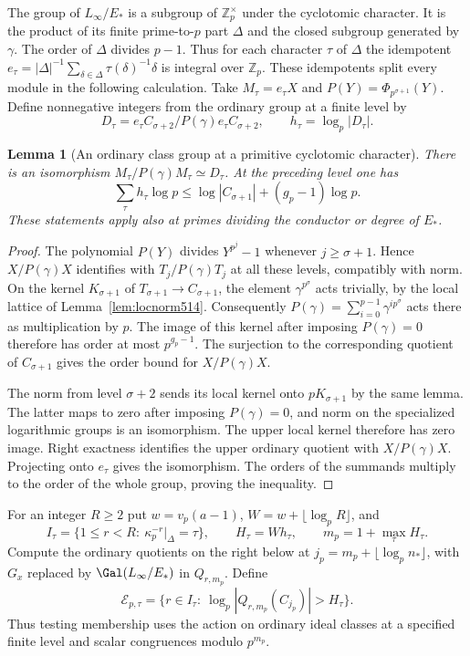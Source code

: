 \documentclass[a4paper,11pt]{article}
\newtheorem{lemma}[proposition]{Lemma}
\theoremstyle{definition}
\theoremstyle{remark}
\newcommand{\ZZ}{\mathbb Z}\newcommand{\ord}{\operatorname{ord}}
\numberwithin{equation}{section}
\begin{document}
The group of \(L_\infty/E_*\) is a subgroup of
\(\ZZ_p^\times\) under the cyclotomic character. It is the product
of its finite prime-to-\(p\) part \(\Delta\) and the closed
subgroup generated by \(\gamma\). The order of \(\Delta\)
divides \(p-1\). Thus for each character \(\tau\) of \(\Delta\)
the idempotent \(e_\tau=|\Delta|^{-1}\sum_{\delta\in\Delta}
\tau(\delta)^{-1}\delta\) is integral over \(\ZZ_p\). These
idempotents split every module in the following calculation.
Take \(M_\tau=e_\tau X\) and \(P(Y)=\Phi_{p^{\sigma+1}}(Y)\).
Define nonnegative integers from the ordinary group at a finite level by
\[
 D_\tau=e_\tau C_{\sigma+2}/P(\gamma)e_\tau C_{\sigma+2},
       \qquad h_\tau=\log_p|D_\tau|.
\]

\begin{lemma}[An ordinary class group at a primitive cyclotomic character]
\leavevmode\label{lem:finiteprimitive515}
There is an isomorphism \(M_\tau/P(\gamma)M_\tau\simeq D_\tau\).
At the preceding level one has
\[
       \sum_\tau h_\tau\log p
       \le \log |C_{\sigma+1}|+(g_p-1)\log p .
\]
These statements apply also at primes dividing the conductor or
degree of \(E_*\).
\end{lemma}
\begin{proof}
The polynomial \(P(Y)\) divides \(Y^{p^j}-1\) whenever
\(j\ge\sigma+1\). Hence \(X/P(\gamma)X\) identifies with
\(T_j/P(\gamma)T_j\) at all these levels, compatibly with norm.
On the kernel \(K_{\sigma+1}\) of \(T_{\sigma+1}\to C_{\sigma+1}\),
the element \(\gamma^{p^\sigma}\) acts trivially, by the local
lattice of Lemma~\ref{lem:locnorm514}. Consequently
\(P(\gamma)=\sum_{i=0}^{p-1}\gamma^{i p^\sigma}\) acts there as
multiplication by \(p\). The image of this kernel after imposing
\(P(\gamma)=0\) therefore has order at most \(p^{g_p-1}\).
The surjection to the corresponding quotient of \(C_{\sigma+1}\)
gives the order bound for \(X/P(\gamma)X\).

The norm from level \(\sigma+2\) sends its local kernel onto
\(pK_{\sigma+1}\) by the same lemma. The latter maps to zero
after imposing \(P(\gamma)=0\), and norm on the specialized
logarithmic groups is an isomorphism. The upper local kernel
therefore has zero image. Right exactness identifies the upper
ordinary quotient with \(X/P(\gamma)X\). Projecting onto
\(e_\tau\) gives the isomorphism. The orders of the summands
multiply to the order of the whole group, proving the inequality.
\end{proof}

For an integer \(R\ge2\) put \(w=v_p(a-1)\),
\(W=w+\lfloor\log_p R\rfloor\), and
\[
 I_\tau=\{1\le r<R:\ \kappa_p^{-r}|_\Delta=\tau\},
 \qquad H_\tau=W h_\tau,\qquad m_p=1+\max_\tau H_\tau .
\]
Compute the ordinary quotients on the right below at
\(j_p=m_p+\lfloor\log_p n_*\rfloor\), with \(G_x\) replaced by
\(\Gal(L_\infty/E_*)\) in \(Q_{r,m_p}\). Define
\[
 \mathcal E_{p,\tau}=
   \{ r\in I_\tau:\ \log_p|Q_{r,m_p}(C_{j_p})|>H_\tau\}.
\]
Thus testing membership uses the action on ordinary ideal classes
at a specified finite level and scalar congruences modulo \(p^{m_p}\).
\end{document}
